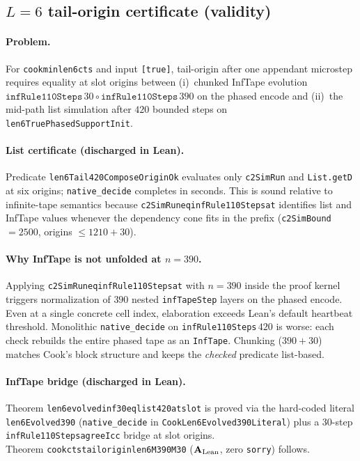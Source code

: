 \documentclass[11pt]{article}
\theoremstyle{remark}
\newcommand{\CatAL}{\ensuremath{\textbf{A}_{\rm Lean}}}
\newcommand{\lean}[1]{%
  \penalty-100
  \begingroup\def\_{\textunderscore\allowbreak}\texttt{#1}\endgroup}
\begin{document}
\begin{appendices}
\subsection{$L=6$ tail-origin certificate (validity)}
\label{app:len6-tail}

\paragraph{Problem.}
For \lean{cook\_min\_len6\_cts} and input \texttt{[true]}, tail-origin after one appendant
microstep requires equality at slot origins between (i)~chunked InfTape evolution
$\texttt{infRule110Steps}\,30 \circ \texttt{infRule110Steps}\,390$ on the phased encode and
(ii)~the mid-path list simulation after $420$ bounded steps on
\texttt{len6TruePhasedSupportInit}.

\paragraph{List certificate (discharged in Lean).}
Predicate \lean{len6Tail420ComposeOriginOk} evaluates only \texttt{c2SimRun} and
\texttt{List.getD} at six origins; \texttt{native\_decide} completes in seconds.
This is sound relative to infinite-tape semantics because \lean{c2SimRun\_eq\_infRule110Steps\_at}
identifies list and InfTape values whenever the dependency cone fits in the prefix
(\texttt{c2SimBound} $= 2500$, origins $\le 1210 + 30$).

\paragraph{Why InfTape is not unfolded at $n = 390$.}
Applying \lean{c2SimRun\_eq\_infRule110Steps\_at} with $n = 390$ inside the proof kernel
triggers normalization of $390$ nested \texttt{infTapeStep} layers on the phased encode.
Even at a single concrete cell index, elaboration exceeds Lean's default heartbeat threshold.
Monolithic \texttt{native\_decide} on \texttt{infRule110Steps}\,$420$ is worse: each check
rebuilds the entire phased tape as an \texttt{InfTape}.
Chunking ($390 + 30$) matches Cook's block structure and keeps the \emph{checked} predicate
list-based.

\paragraph{InfTape bridge (discharged in Lean).}
Theorem \lean{len6\_evolved\_inf30\_eq\_list420\_at\_slot} is proved via the hard-coded literal
\lean{len6Evolved390} (\texttt{native\_decide} in \texttt{CookLen6\allowbreak{}Evolved390\allowbreak{}Literal}) plus a
30-step \lean{infRule110Steps\_agree\_Icc} bridge at slot origins.\\
Theorem \lean{cook\_cts\_tail\_origin\_len6\_M390\_M30} ($\CatAL$, zero \texttt{sorry}) follows.


\end{appendices}
\end{document}
